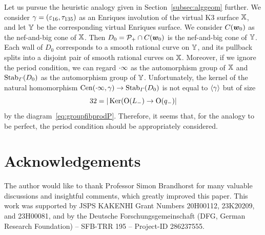 \documentclass{amsart} %
\begin{document}
 \begin{remark}\label{rem:further}
 Let us pursue the heuristic analogy given in Section~\ref{subsec:alggeom} further.
We consider $\gamma=(\varepsilon_{16}, \tau_{135})$ as an Enriques involution of 
the virtual K3 surface $\mathord{\mathbb{X}}$,
and let $\mathord{\mathbb{Y}}$ be the corresponding virtual Enriques surface.
We consider $\mathord{C}(\boldsymbol{w}_0)$ as the nef-and-big cone of $\mathord{\mathbb{X}}$.
Then $D_0=\mathord{\mathcal{P}}_{+}\cap \mathord{C}(\boldsymbol{w}_0)$ is the nef-and-big cone of $\mathord{\mathbb{Y}}$.
Each wall of $D_0$ corresponds to a smooth rational curve on $\mathord{\mathbb{Y}}$,
and its pullback  splits into a disjoint pair of smooth rational curves on $\mathord{\mathbb{X}}$.
Moreover, if we ignore the period condition, 
we can regard $\cdot \infty$ as the automorphism group of $\mathord{\mathbb{X}}$ 
and $\operatorname{Stab}_{\varGamma}(D_0)$  as the automorphism group of $\mathord{\mathbb{Y}}$.
Unfortunately, the kernel of 
the natural homomorphism $\mathrm{Cen}(\cdot \infty,\gamma)\to\operatorname{Stab}_{\varGamma}(D_0)$
is not equal to $\langle {\gamma} \rangle$  but  of size 
\[
32=|\operatorname{Ker}(\mathord{\mathrm{O}}(L_{-}) \to \mathord{\mathrm{O}}(q_{-})|
\]
by the diagram~\eqref{eq:groupfibprodP}.
Therefore,  it seems that, for  the analogy to be perfect, 
 the period condition  should be appropriately considered.
 \end{remark}
\section*{Acknowledgements}
The author would like to thank Professor Simon Brandhorst for many valuable discussions and insightful comments, which greatly improved this paper.
This work was supported by JSPS KAKENHI Grant Numbers 20H00112, 23K20209, and 23H00081, and by the Deutsche Forschungsgemeinschaft (DFG, German Research Foundation) – SFB-TRR 195 – Project-ID 286237555.
%
%
%



%
\end{document}
